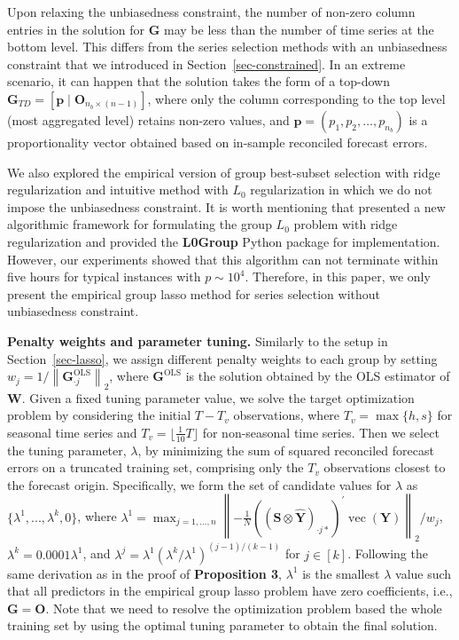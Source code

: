 \documentclass[
  12pt,
  11pt]{article}
\begin{document}
Upon relaxing the unbiasedness constraint, the number of non-zero column
entries in the solution for \(\bm{G}\) may be less than the number of
time series at the bottom level. This differs from the series selection
methods with an unbiasedness constraint that we introduced in
Section~\ref{sec-constrained}. In an extreme scenario, it can happen
that the solution takes the form of a top-down
\(\bm{G}_{TD}=[\bm{p} \mid \bm{O}_{n_b \times (n-1)}]\), where only the
column corresponding to the top level (most aggregated level) retains
non-zero values, and \(\bm{p} = (p_1, p_2, \ldots, p_{n_b})\) is a
proportionality vector obtained based on in-sample reconciled forecast
errors.

We also explored the empirical version of group best-subset selection
with ridge regularization and intuitive method with \(L_0\)
regularization in which we do not impose the unbiasedness constraint. It
is worth mentioning that \citet{Hazimeh2023-ie} presented a new
algorithmic framework for formulating the group \(L_0\) problem with
ridge regularization and provided the \textbf{L0Group} Python package
for implementation. However, our experiments showed that this algorithm
can not terminate within five hours for typical instances with
\(p \sim 10^4\). Therefore, in this paper, we only present the empirical
group lasso method for series selection without unbiasedness constraint.

\textbf{Penalty weights and parameter tuning.} Similarly to the setup in
Section~\ref{sec-lasso}, we assign different penalty weights to each
group by setting
\(w_j = 1/\left\|\bm{G}_{\cdot j}^{\text{OLS}}\right\|_2\), where
\(\bm{G}^{\text{OLS}}\) is the solution obtained by the OLS estimator of
\(\bm{W}\). Given a fixed tuning parameter value, we solve the target
optimization problem by considering the initial \(T-T_v\) observations,
where \(T_v = \max\{h, s\}\) for seasonal time series and
\(T_v = \lfloor \frac{1}{10}T \rfloor\) for non-seasonal time series.
Then we select the tuning parameter, \(\lambda\), by minimizing the sum
of squared reconciled forecast errors on a truncated training set,
comprising only the \(T_v\) observations closest to the forecast origin.
Specifically, we form the set of candidate values for \(\lambda\) as
\(\{\lambda^{1},...,\lambda^{k}, 0\}\), where
\(\lambda^{1} = \max _{j=1, \ldots, n}\left\|-\frac{1}{N}\left(\left(\bm{S} \otimes \hat{\bm{Y}}\right)_{\cdot j*}\right)^{\prime} \operatorname{vec}(\bm{Y})\right\|_2 / w_j\),
\(\lambda^{k} = 0.0001\lambda^{1}\), and
\(\lambda^{j} = \lambda^{1}\left(\lambda^{k} / \lambda^{1}\right)^{(j-1) / (k-1)}\)
for \(j \in [k]\). Following the same derivation as in the proof of
\textbf{Proposition 3}, \(\lambda^{1}\) is the smallest \(\lambda\)
value such that all predictors in the empirical group lasso problem have
zero coefficients, i.e., \(\bm{G} = \bm{O}\). Note that we need to
resolve the optimization problem based the whole training set by using
the optimal tuning parameter to obtain the final solution.
\end{document}
